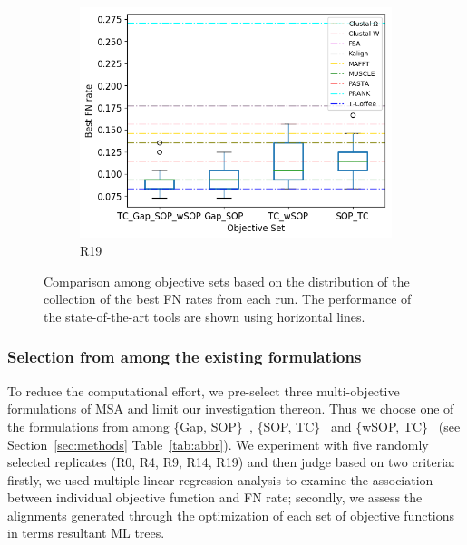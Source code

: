 \begin{figure}[!htbp]
\begin{adjustwidth}{-1cm}{-1cm}
\begin{subfigure}{0.22\textwidth}
		\includegraphics[width=\columnwidth]{Figure/summary/precomputedInit/R19/objset_fnrate_rank}
		\caption{R19}
	\end{subfigure}
	\caption{Comparison among objective sets based on the distribution of the collection of the best FN rates from each run. The performance of the state-of-the-art tools are shown using horizontal lines.}
	\label{fig:rank_best_fn_rate}
\end{adjustwidth}
\end{figure}
\subsubsection{Selection from among the existing formulations}
\label{sec:existing_msa_formulation}
To reduce the computational effort, we pre-select three multi-objective formulations of MSA and limit our investigation thereon. Thus we choose one of the formulations from among \{Gap, SOP\}~\citep{abbasi2015local}, \{SOP, TC\}~\citep{da2010alineaga} and \{wSOP, TC\}~\citep{rubio2016bee, rubio2016hybrid} (see Section~\ref{sec:methods} Table~\ref{tab:abbr}). We experiment with five randomly selected replicates (R0, R4, R9, R14, R19) and then judge based on two criteria: firstly, we used multiple linear regression analysis to examine the association between individual objective function and FN rate; secondly, we assess the alignments generated through the optimization of each set of objective functions in terms resultant ML trees. 

